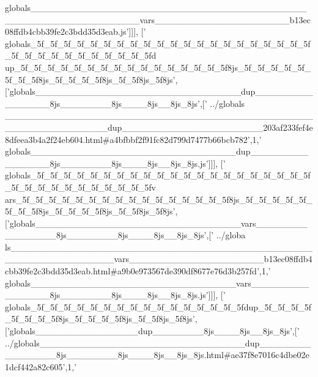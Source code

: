 \begin{DoxyCode}
{      globals\_\_\_\_\_\_\_\_\_\_\_\_\_\_\_\_\_\_\_\_\_\_\_\_\_\_\_\_\_\_\_\_\_\_\_\_\_\_\_\_\_\_\_\_\_\_\_\_\_\_\_\_\_\_\_\_\_\_\_\_\_\_\_\_vars\_\_\_\_\_\_\_\_\_\_\_\_\_\_\_\_\_\_\_\_\_b13ec08ffdb4cbb39fe2c3bdd35d3eab.js'}]]],
  [\textcolor{stringliteral}{'
      globals\_5f\_5f\_5f\_5f\_5f\_5f\_5f\_5f\_5f\_5f\_5f\_5f\_5f\_5f\_5f\_5f\_5f\_5f\_5f\_5f\_5f\_5f\_5f\_5f\_5f\_5f\_5f\_5f\_5f\_5f\_5f\_5fd
      up\_5f\_5f\_5f\_5f\_5f\_5f\_5f\_5f\_5f\_5f\_5f\_5f\_5f\_5f\_5f\_5f8js\_5f\_5f\_5f\_5f\_5f\_5f\_5f\_5f8js\_5f\_5f\_5f\_5f8js\_5f\_5f8js\_5f8js'},[\textcolor{stringliteral}{'globals\_\_\_\_\_\_\_\_\_\_\_\_\_\_\_\_\_\_\_\_\_\_\_\_\_\_\_\_\_\_\_\_dup\_\_\_\_\_\_\_\_\_\_\_\_\_\_\_\_8js\_\_\_\_\_\_\_\_8js\_\_\_\_8js\_\_8js\_8js'},[\textcolor{stringliteral}{'
      ../globals
      \_\_\_\_\_\_\_\_\_\_\_\_\_\_\_\_\_\_\_\_\_\_\_\_\_\_\_\_\_\_\_\_\_\_\_\_\_\_\_\_\_\_\_\_\_\_\_\_\_\_\_\_\_\_\_\_\_\_\_\_\_\_\_\_dup\_\_\_\_\_\_\_\_\_\_\_\_\_\_\_\_\_\_\_\_\_\_203af233fef4e8dfeea3b4a2f24eb604.html#a4bfbbf2f91fc82d799d7477b66bcb782'},1,\textcolor{stringliteral}{'
      globals\_\_\_\_\_\_\_\_\_\_\_\_\_\_\_\_\_\_\_\_\_\_\_\_\_\_\_\_\_\_\_\_dup\_\_\_\_\_\_\_\_\_\_\_\_\_\_\_\_8js\_\_\_\_\_\_\_\_8js\_\_\_\_8js\_\_8js\_8js.js'}]]],
  [\textcolor{stringliteral}{'
      globals\_5f\_5f\_5f\_5f\_5f\_5f\_5f\_5f\_5f\_5f\_5f\_5f\_5f\_5f\_5f\_5f\_5f\_5f\_5f\_5f\_5f\_5f\_5f\_5f\_5f\_5f\_5f\_5f\_5f\_5f\_5f\_5fv
      ars\_5f\_5f\_5f\_5f\_5f\_5f\_5f\_5f\_5f\_5f\_5f\_5f\_5f\_5f\_5f\_5f8js\_5f\_5f\_5f\_5f\_5f\_5f\_5f\_5f8js\_5f\_5f\_5f\_5f8js\_5f\_5f8js\_5f8js'},[\textcolor{stringliteral}{'globals\_\_\_\_\_\_\_\_\_\_\_\_\_\_\_\_\_\_\_\_\_\_\_\_\_\_\_\_\_\_\_\_vars\_\_\_\_\_\_\_\_\_\_\_\_\_\_\_\_8js\_\_\_\_\_\_\_\_8js\_\_\_\_8js\_\_8js\_8js'},[\textcolor{stringliteral}{'
      ../globa
      ls\_\_\_\_\_\_\_\_\_\_\_\_\_\_\_\_\_\_\_\_\_\_\_\_\_\_\_\_\_\_\_\_\_\_\_\_\_\_\_\_\_\_\_\_\_\_\_\_\_\_\_\_\_\_\_\_\_\_\_\_\_\_\_\_vars\_\_\_\_\_\_\_\_\_\_\_\_\_\_\_\_\_\_\_\_\_b13ec08ffdb4cbb39fe2c3bdd35d3eab.html#a9b0e973567de390df8677e76d3b257fd'},1,\textcolor{stringliteral}{'
      globals\_\_\_\_\_\_\_\_\_\_\_\_\_\_\_\_\_\_\_\_\_\_\_\_\_\_\_\_\_\_\_\_vars\_\_\_\_\_\_\_\_\_\_\_\_\_\_\_\_8js\_\_\_\_\_\_\_\_8js\_\_\_\_8js\_\_8js\_8js.js'}]]],
  [\textcolor{stringliteral}{'
      globals\_5f\_5f\_5f\_5f\_5f\_5f\_5f\_5f\_5f\_5f\_5f\_5f\_5f\_5f\_5f\_5fdup\_5f\_5f\_5f\_5f\_5f\_5f\_5f\_5f8js\_5f\_5f\_5f\_5f8js\_5f\_5f8js\_5f8js'},[\textcolor{stringliteral}{'globals\_\_\_\_\_\_\_\_\_\_\_\_\_\_\_\_dup\_\_\_\_\_\_\_\_8js\_\_\_\_8js\_\_8js\_8js'},[\textcolor{stringliteral}{'
      ../globals\_\_\_\_\_\_\_\_\_\_\_\_\_\_\_\_\_\_\_\_\_\_\_\_\_\_\_\_\_\_\_\_dup\_\_\_\_\_\_\_\_\_\_\_\_\_\_\_\_8js\_\_\_\_\_\_\_\_8js\_\_\_\_8js\_\_8js\_8js.html#ae37f8e7016c4dbe02e1dcf442a82c605'},1,\textcolor{stringliteral}{'
}
\end{DoxyCode}
